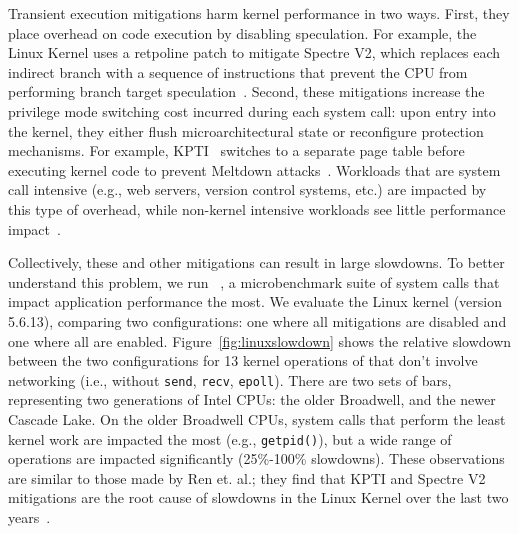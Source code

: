 Transient execution mitigations harm kernel performance in two
ways. First, they place overhead on code execution by disabling
speculation.  For example, the Linux Kernel uses a retpoline patch to
mitigate Spectre V2, which replaces each indirect branch with a
sequence of instructions that prevent the CPU from performing branch
target speculation~\cite{intel:retpoline}. Second, these mitigations
increase the privilege mode switching cost incurred during each system
call: upon entry into the kernel, they either flush microarchitectural
state or reconfigure protection mechanisms.  For example,
KPTI~\cite{gruss:kaiser,linux:kpti} switches to a separate page table
before executing kernel code to prevent Meltdown
attacks~\cite{lipp:meltdown}.  Workloads
that are system call intensive (e.g., web servers, version control
systems, etc.) are impacted by this type of overhead, while non-kernel
intensive workloads see little performance impact~\cite{gruss:kaiser}.

Collectively, these and other mitigations can result in large
slowdowns. To better understand this problem, we run
\bench~\cite{lebench}, a microbenchmark suite of system calls
that impact application
performance the most.  We evaluate the Linux kernel (version 5.6.13),
comparing two configurations: one where all mitigations are disabled
and one where all are enabled. Figure~\ref{fig:linuxslowdown} shows
the relative slowdown between the two configurations for 13 kernel
operations of \bench that don't involve networking (i.e., without
\texttt{send}, \texttt{recv}, \texttt{epoll}).  There are two sets of
bars, representing two generations of Intel CPUs: the older Broadwell,
and the newer Cascade Lake.  On the older Broadwell CPUs,
system calls that perform the least kernel work are impacted the most
(e.g., \texttt{getpid()}), but a wide range of operations are impacted
significantly (25\%-100\% slowdowns). These observations are similar
to those made by Ren et. al.; they find that KPTI and Spectre V2
mitigations are the root cause of slowdowns in the Linux
Kernel over the last two years~\cite{lebench}.

